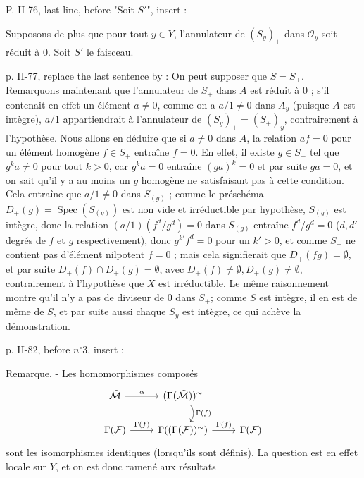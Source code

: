 P. II-76, last line, before "Soit $S'$", insert :

\newpage


\noindent Supposons de plus que pour tout $y \in Y$, l'annulateur de $(S_y)_+$ dans $\mathcal{O}_y$ soit réduit à $0$. Soit $S'$ le faisceau.

\noindent p. II-77, replace the last sentence by :
On peut supposer que $S=S_+$. Remarquons maintenant que l'annulateur de $S_+$ dans $A$ est réduit à $0$ ; s'il contenait en effet un élément $a \neq 0$, comme on a $a/1 \neq 0$ dans $A_y$ (puisque $A$ est intègre), $a/1$ appartiendrait à l'annulateur de $(S_y)_+=(S_+)_y$, contrairement à l'hypothèse. Nous allons en déduire que si $a \neq 0$ dans $A$, la relation $af=0$ pour un élément homogène $f \in S_+$ entraîne $f=0$. En effet, il existe $g \in S_+$ tel que $g^k a \neq 0$ pour tout $k > 0$, car $g^k a = 0$ entraîne $(ga)^k = 0$ et par suite $ga = 0$, et on sait qu'il y a au moins un $g$ homogène ne satisfaisant pas à cette condition. Cela entraîne que $a/1 \neq 0$ dans $S_{(g)}$ ; comme le préschéma $D_+(g) = \operatorname{Spec}(S_{(g)})$ est non vide et irréductible par hypothèse, $S_{(g)}$ est intègre, donc la relation $(a/1)(f^d/g^d) = 0$ dans $S_{(g)}$ entraîne $f^d/g^d = 0$ ($d, d'$ degrés de $f$ et $g$ respectivement), donc $g^{k'}f^d = 0$ pour un $k' > 0$, et comme $S_+$ ne contient pas d'élément nilpotent $f=0$ ; mais cela signifierait que $D_+(fg) = \emptyset$, et par suite $D_+(f) \cap D_+(g) = \emptyset$, avec $D_+(f) \neq \emptyset, D_+(g) \neq \emptyset$, contrairement à l'hypothèse que $X$ est irréductible. Le même raisonnement montre qu'il n'y a pas de diviseur de $0$ dans $S_+$; comme $S$ est intègre, il en est de même de $S$, et par suite aussi chaque $S_y$ est intègre, ce qui achève la démonstration.

\noindent p. II-82, before $n^\circ 3$, insert :

\noindent Remarque. - Les homomorphismes composés
$$\begin{tikzcd}
\tilde{\mathcal{M}} \ar[r, "\alpha"] \ar[d, phantom, ""{coordinate, name=Y}] & (\Gamma(\tilde{\mathcal{M}}))^\sim \ar[d, bend left=40, "\Gamma(f)"] \\
\Gamma(\mathcal{F}) \ar[r, "\Gamma(f)"] & \Gamma((\Gamma(\mathcal{F}))^\sim) \ar[u, phantom, ""{coordinate, name=X}] \ar[r, "\Gamma(f)"] & \Gamma(\mathcal{F})
\end{tikzcd}$$
sont les isomorphismes identiques (lorsqu'ils sont définis). La question est en effet locale sur $Y$, et on est donc ramené aux résultats

